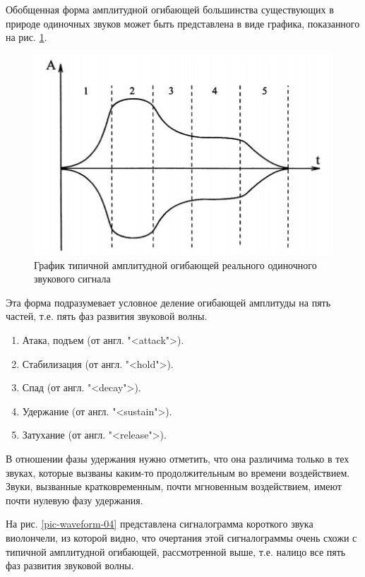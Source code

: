 \documentclass[oneside, final, 14pt]{extreport}
\begin{document}
Обобщенная форма амплитудной огибающей большинства существующих в природе одиночных звуков может быть представлена в виде графика, показанного
на рис. \ref{pic-waveform-03}.

\begin{figure}[h]
\centering
\includegraphics{pic-waveform-03}
\caption{График типичной амплитудной огибающей реального одиночного звукового сигнала}
\label{pic-waveform-03}
\end{figure}

Эта форма подразумевает условное деление огибающей амплитуды на пять частей, т.е. пять фаз развития звуковой волны.
\begin{enumerate}
\item Атака, подъем (от англ. "<attack">).
\item Стабилизация (от англ. "<hold">).
\item Спад (от англ. "<decay">).
\item Удержание (от англ. "<sustain">).
\item Затухание (от англ. "<release">).
\end{enumerate}

В отношении фазы удержания нужно отметить, что она различима только в тех звуках, которые вызваны каким-то продолжительным во времени воздействием. Звуки, вызванные кратковременным, почти мгновенным воздействием, имеют почти нулевую фазу удержания.

На рис. \ref{pic-waveform-04} представлена сигналограмма короткого звука виолончели, из которой видно, что очертания этой сигналограммы очень схожи с типичной амплитудной огибающей, рассмотренной выше, т.е. налицо все пять фаз развития звуковой волны.
\end{document}

